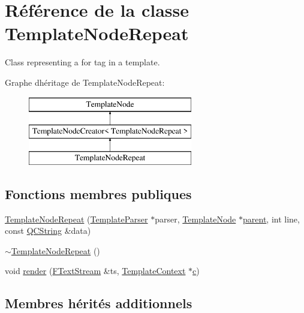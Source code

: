 \hypertarget{class_template_node_repeat}{}\section{Référence de la classe Template\+Node\+Repeat}
\label{class_template_node_repeat}


Class representing a \textquotesingle{}for\textquotesingle{} tag in a template.  


Graphe d\textquotesingle{}héritage de Template\+Node\+Repeat\+:\begin{figure}[H]
\begin{center}
\leavevmode
\includegraphics[height=3.000000cm]{class_template_node_repeat}
\end{center}
\end{figure}
\subsection*{Fonctions membres publiques}
\begin{DoxyCompactItemize}
\item 
\hyperlink{class_template_node_repeat_a2375c0b5d57a0efd46bfb0f49f9191fb}{Template\+Node\+Repeat} (\hyperlink{class_template_parser}{Template\+Parser} $\ast$parser, \hyperlink{class_template_node}{Template\+Node} $\ast$\hyperlink{class_template_node_a69a306ef84e62af9fe57bf9aacc94536}{parent}, int line, const \hyperlink{class_q_c_string}{Q\+C\+String} \&data)
\item 
\hyperlink{class_template_node_repeat_ab41c660a196580d50abc93bd49f261e7}{$\sim$\+Template\+Node\+Repeat} ()
\item 
void \hyperlink{class_template_node_repeat_a07160af252e718da305d5c3e34346422}{render} (\hyperlink{class_f_text_stream}{F\+Text\+Stream} \&ts, \hyperlink{class_template_context}{Template\+Context} $\ast$\hyperlink{060__command__switch_8tcl_ab14f56bc3bd7680490ece4ad7815465f}{c})
\end{DoxyCompactItemize}
\subsection*{Membres hérités additionnels}


